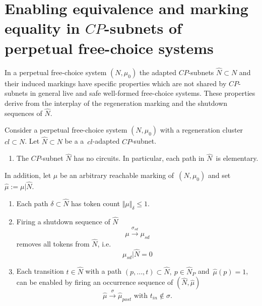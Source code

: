 \documentclass{fundam}
\begin{document}
\section{Enabling equivalence and marking equality in $CP$-subnets of \\ perpetual free-choice systems}\label{sect_cpsystemsperpetualitymarkings}

In a perpetual free-choice system $(N,\mu_0)$ the adapted $CP$-subnets $\hat{N} \subset N$ and their induced markings have specific properties which are not shared by $CP$-subnets in general live and safe well-formed free-choice systems. These properties derive from the interplay of the regeneration marking and the shutdown sequences of $\hat{N}$.

\begin{proposition}\label{prop_cpnetsubnetsperpetual}
Consider a perpetual free-choice system $(N,\mu_0)$ with a regeneration cluster $cl \subset N$. Let $\hat{N} \subset N$ be a \mbox{a $cl$-adapted} $CP$-subnet.
\begin{enumerate}
\item The $CP$-subnet $\hat{N}$ has no circuits. In particular, each path in $\hat{N}$\ is elementary.
\end{enumerate}
In addition, let $\mu$ be an arbitrary reachable marking \mbox{of $(N,\mu_0)$} and set $\hat{\mu}:=\mu|\hat{N}$.
\begin{enumerate}\addtocounter{enumi}{1}
\item Each path $\delta \subset \hat{N}$ has token count $\Vert \mu \Vert_\delta \leq 1$.

\item Firing a shutdown sequence of $\hat{N}$
$$\mu \xrightarrow{\sigma_{sd}} \mu_{sd}$$
removes all tokens from $\hat{N}$, i.e.
$$\mu_{sd}|\hat{N}=0$$
\item Each transition $t\in \hat{N}$ with a path $(p,...,t) \subset \hat{N},\ p \in \hat{N}_P$ \mbox{and $\hat{\mu}(p)=1$}, can be enabled by firing an occurrence sequence of $(\hat{N},\hat{\mu})$
$$\hat{\mu} \xrightarrow{\sigma} \hat{\mu}_{post} \text{ with } t_{in} \notin \sigma.$$
\end{enumerate}
\end{proposition}
\end{document}
